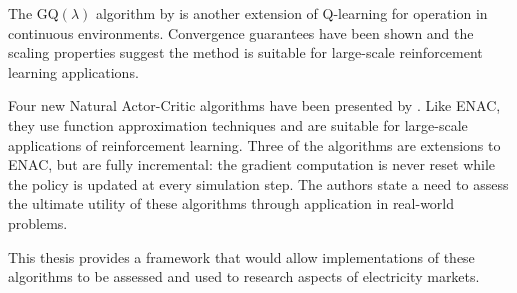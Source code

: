 The GQ$(\lambda)$ algorithm by  is another extension of Q-learning
for operation in continuous environments.  Convergence guarantees have been
shown and the scaling properties suggest the method is suitable for large-scale
reinforcement learning applications.

Four new Natural Actor-Critic algorithms have been presented by
. Like ENAC, they use function approximation techniques and
are suitable for large-scale applications of reinforcement learning.  Three of
the algorithms are extensions to ENAC, but are fully incremental: the gradient
computation is never reset while the policy is updated at every simulation step.
 The authors state a need to assess the ultimate utility of these algorithms
through application in real-world problems.

This thesis provides a framework that would allow implementations of these
algorithms to be assessed and used to research aspects of electricity
markets.

